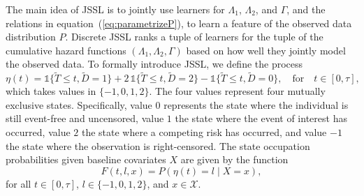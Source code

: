 \documentclass[a4paper,danish]{article}
\theoremstyle{plain} %
\numberwithin{theorem}{section}
\theoremstyle{definition} %
\theoremstyle{remark}
\newcommand{\1}{\mathds{1}}
\begin{document}
The main idea of JSSL is to jointly use learners for \(
\Lambda_1 \), \( \Lambda_2 \), and \( \Gamma \), and the relations in
equation~(\ref{eq:parametrizeP}), to learn a feature of the observed
data distribution \( P \). Discrete JSSL ranks a tuple of
learners for the tuple of the cumulative hazard functions \(
(\Lambda_1, \Lambda_2, \Gamma) \) based on how well they jointly model
the observed data. To formally introduce JSSL, we define
the process 
\begin{equation*}
  \eta(t) = \1\{\tilde{T} \leq t, \tilde D=1\} + 2\,\1\{\tilde{T} \leq t, \tilde
  D=2\} - \1\{\tilde{T} \leq t, \tilde D=0\},
  \quad \text{for} \quad t \in [0, \tau],
\end{equation*}
which takes values in \( \{-1,0,1,2\}\). The four values
represent four mutually exclusive states. Specifically, value
\( 0 \) represents the state where the individual is still
event-free and uncensored, value \( 1\) the state where the
event of interest has occurred, value \( 2\) the state where a
competing risk has occurred, and value \( -1\) the state where
the observation is right-censored. The state occupation
probabilities given baseline covariates \( X \) are given by
the function
\begin{equation}
  \label{eq:F-def}
  F(t, l, x) = P(\eta(t) = l \mid X=x),
\end{equation}
for all \( t \in [0,\tau] \), \( l \in \{-1,0,1,2\} \), and
\( x \in \mathcal{X} \).
\end{document}

